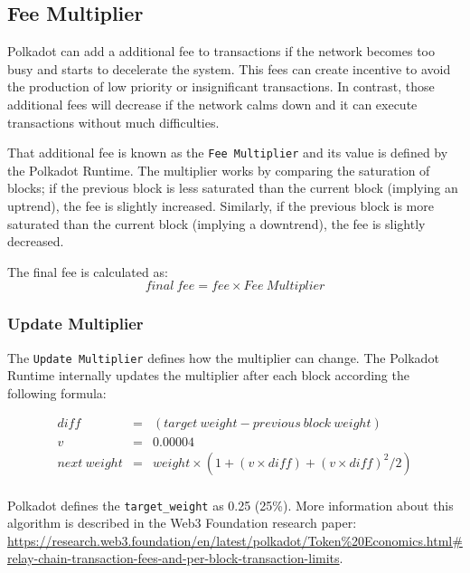 \documentclass[11pt,a4paper]{article}
\begin{document}
\subsection{Fee Multiplier}
Polkadot can add a additional fee to transactions if the network becomes too busy and starts to
decelerate the system. This fees can create incentive to avoid the production of
low priority or insignificant transactions. In contrast, those additional fees will decrease if
the network calms down and it can execute transactions without much difficulties.
\newline

That additional fee is known as the \verb|Fee Multiplier| and its value is defined
by the Polkadot Runtime. The multiplier works by comparing the saturation of blocks; if the previous 
block is less saturated than the current block (implying an uptrend), the fee is slightly increased.
Similarly, if the previous block is more saturated than the current block (implying a downtrend), the
fee is slightly decreased.
\newline

The final fee is calculated as:
$$
      final\ fee = fee \times Fee\ Multiplier
$$

\subsubsection{Update Multiplier}
The \verb|Update Multiplier| defines how the multiplier can change. The Polkadot Runtime internally
updates the multiplier after each block according the following formula:

\begin{eqnarray*}
diff &=& (target\ weight - previous\ block\ weight)\\
v &=& 0.00004\\
next\ weight &=& weight \times (1 + (v \times diff) + (v \times diff)^2 / 2)\\
\end{eqnarray*}

Polkadot defines the \verb|target_weight| as 0.25 (25\%). More information about this algorithm is described
in the Web3 Foundation research paper: \url{https://research.web3.foundation/en/latest/polkadot/Token%20Economics.html#relay-chain-transaction-fees-and-per-block-transaction-limits}.
\end{document}
